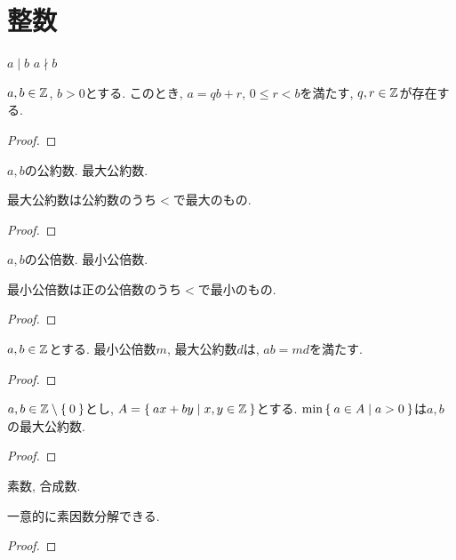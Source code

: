   \section{整数}
  \begin{definition}
    $a \mid b$
    $a\nmid b$
  \end{definition}
  \begin{theorem}
    $a,b\in\mathbb{Z}$, $b>0$とする.
    このとき,
    $a=qb+r$, $0\leq r < b$を満たす, $q,r\in\mathbb{Z}$が存在する.
  \end{theorem}
\begin{proof}\end{proof}
  \begin{definition}
    $a,b$の公約数. 最大公約数.
  \end{definition}
  \begin{prop}
    最大公約数は公約数のうち$<$で最大のもの.
  \end{prop}
\begin{proof}\end{proof}
  \begin{definition}
    $a,b$の公倍数. 最小公倍数.
  \end{definition}
  \begin{prop}
    最小公倍数は正の公倍数のうち$<$で最小のもの.
  \end{prop}
\begin{proof}\end{proof}
  \begin{prop}
    $a,b\in\mathbb{Z}$とする.
    最小公倍数$m$, 最大公約数$d$は,
    $ab=md$を満たす.
  \end{prop}
\begin{proof}\end{proof}
  
  \begin{prop}
    $a,b\in\mathbb{Z}\setminus\Set{0}$とし,
    $A=\Set{ax+by|x,y\in\mathbb{Z}}$とする.
    $\min\Set{a\in A|a>0}$は$a,b$の最大公約数.
  \end{prop}
\begin{proof}\end{proof}

  \begin{definition}
    素数, 合成数.
  \end{definition}

  \begin{prop}
    一意的に素因数分解できる.
  \end{prop}
\begin{proof}\end{proof}

